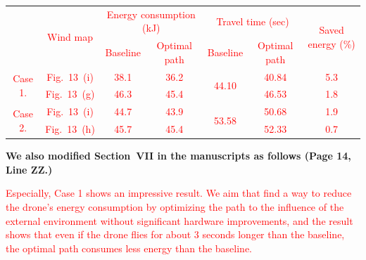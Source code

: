 \documentclass[onecolumn]{IEEEconf}
\begin{document}
\begin{description}
\begin{mdframed}[ linewidth=.75pt, userdefinedwidth=0.9\textwidth]
    \centering
    \label{tab: opt.result}
    \textcolor{red}{
    \begin{tabular}{|c|c|c|c|c|c|c|}
    \hline
    \multirow{2}{*}{} & \multirow{2}{*}{Wind map} & \multicolumn{2}{c|}{Energy consumption (kJ)} & \multicolumn{2}{c|}{Travel time (sec)} & \multirow{2}{*}{Saved energy (\%)} \\ \cline{3-6}
                        &            & Baseline & Optimal path & Baseline               & Optimal path &      \\ \hline
    \multirow{2}{*}{Case 1.} & Fig.~13~(i) & 38.1     & 36.2         & \multirow{2}{*}{44.10} & 40.84        & 5.3 \\ \cline{2-4} \cline{6-7} 
                        & Fig.~13~(g) & 46.3     & 45.4         &                        & 46.53        & 1.8  \\ \hline
    \multirow{2}{*}{Case 2.} & Fig.~13~(i) & 44.7     & 43.9         & \multirow{2}{*}{53.58} & 50.68        & 1.9  \\ \cline{2-4} \cline{6-7} 
                        & Fig.~13~(h) & 45.7     & 45.4         &                        & 52.33        & 0.7  \\ \hline
    \end{tabular}%
    }
    \end{mdframed} 
    \textbf{We also modified Section~VII in the manuscripts as follows (Page 14, Line ZZ.)}\\
    \begin{mdframed}[ linewidth=.75pt, userdefinedwidth=0.9\textwidth]
    \textcolor{red}{Especially, Case 1 shows an impressive result. 
    We aim that find a way to reduce the drone's energy consumption by optimizing the path to the influence of the external environment without significant hardware improvements, and the result shows that even if the drone flies for about 3 seconds longer than the baseline, the optimal path consumes less energy than the baseline.}
    \end{mdframed}
    ~\\
	~\\
\end{description}

%
%
\end{document}
